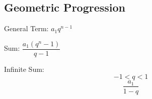 \subsection{Geometric Progression}


General Term: $ a_{1} q^{n - 1} $

Sum: $ \dfrac{a_{1} (q^{n} - 1)}{q - 1} $

Infinite Sum:
$$ -1 < q < 1 $$
$$ \dfrac{a_{1}}{1 - q} $$